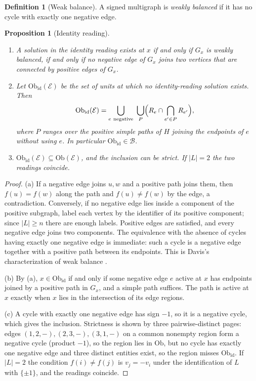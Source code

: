 \documentclass[11pt]{article}
\theoremstyle{plain}
\newtheorem{proposition}[theorem]{Proposition}
\theoremstyle{definition}
\newtheorem{definition}[theorem]{Definition}
\theoremstyle{remark}
\newcommand{\Ob}{\mathrm{Ob}}
\begin{document}
\begin{definition}[Weak balance]
A signed multigraph is \emph{weakly balanced} if it has no cycle with exactly one negative edge.
\end{definition}

\begin{proposition}[Identity reading]\label{prop:identity}
\begin{enumerate}[label=(\alph*)]
\item A solution in the identity reading exists at $x$ if and only if $G_x$ is weakly balanced, if and only if no negative edge of $G_x$ joins two vertices that are connected by positive edges of $G_x$.
\item Let $\Ob_{\mathrm{id}}(\mathcal E)$ be the set of units at which no identity-reading solution exists. Then
\[
\Ob_{\mathrm{id}}(\mathcal E)=\bigcup_{e\ \mathrm{negative}}\ \bigcup_{P}\Bigl(R_e\cap\bigcap_{e'\in P}R_{e'}\Bigr),
\]
where $P$ ranges over the positive simple paths of $H$ joining the endpoints of $e$ without using $e$. In particular $\Ob_{\mathrm{id}}\in\mathcal B$.
\item $\Ob_{\mathrm{id}}(\mathcal E)\subseteq\Ob(\mathcal E)$, and the inclusion can be strict. If $|L|=2$ the two readings coincide.
\end{enumerate}
\end{proposition}

\begin{proof}
(a) If a negative edge joins $u,w$ and a positive path joins them, then $f(u)=f(w)$ along the path and $f(u)\ne f(w)$ by the edge, a contradiction. Conversely, if no negative edge lies inside a component of the positive subgraph, label each vertex by the identifier of its positive component; since $|L|\ge n$ there are enough labels. Positive edges are satisfied, and every negative edge joins two components. The equivalence with the absence of cycles having exactly one negative edge is immediate: such a cycle is a negative edge together with a positive path between its endpoints. This is Davis's characterization of weak balance \cite{davis1967}.

(b) By (a), $x\in\Ob_{\mathrm{id}}$ if and only if some negative edge $e$ active at $x$ has endpoints joined by a positive path in $G_x$, and a simple path suffices. The path is active at $x$ exactly when $x$ lies in the intersection of its edge regions.

(c) A cycle with exactly one negative edge has sign $-1$, so it is a negative cycle, which gives the inclusion. Strictness is shown by three pairwise-distinct pages: edges $(1,2,-),(2,3,-),(3,1,-)$ on a common nonempty region form a negative cycle (product $-1$), so the region lies in $\Ob$, but no cycle has exactly one negative edge and three distinct entities exist, so the region misses $\Ob_{\mathrm{id}}$. If $|L|=2$ the condition $f(i)\ne f(j)$ is $v_j=-v_i$ under the identification of $L$ with $\{\pm1\}$, and the readings coincide.
\end{proof}
\end{document}
